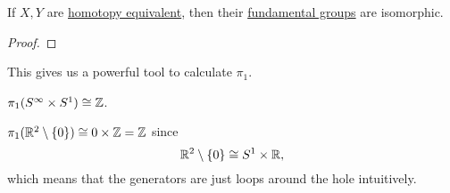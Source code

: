 \begin{theorem}\label{thm:fundamental-group-is-a-homotopy-invariant}
	If \(X, Y\) are \hyperref[def:homotopy-equivalence]{homotopy equivalent}, then their \hyperref[def:fundamental-group]{fundamental groups} are isomorphic.
\end{theorem}
\begin{proof}
\end{proof}

\begin{remark}
	This gives us a powerful tool to calculate \(\pi _1\).
\end{remark}

\begin{eg}
	\(\pi _1(S^{\infty }\times S^1) \cong \mathbb{\MakeUppercase{z}} \).
\end{eg}
\begin{eg}
	\(\pi _1(\mathbb{\MakeUppercase{r}} ^2\setminus \{0\}) \cong 0\times \mathbb{\MakeUppercase{z}} = \mathbb{\MakeUppercase{z}}\) since
	\[
		\mathbb{\MakeUppercase{r}} ^2\setminus \{0\}\cong S^{1}\times \mathbb{\MakeUppercase{r}},
	\]
	which means that the generators are just loops around the hole intuitively.
\end{eg}

